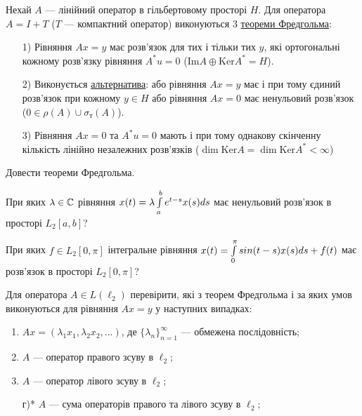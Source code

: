 
\begin{theory}
    Нехай $A$ --- лінійний оператор в гільбертовому просторі $H$. 
    Для оператора $A = I + T$ ($T$ --- компактний оператор) виконуються 
    3 \ul{теореми Фредгольма}:
    \begin{enumerate}
        \item[1)] Рівняння $Ax = y$ має розв'язок для тих і 
        тільки тих $y$, які ортогональні кожному розв'язку рівняння 
        $A^*u = 0$ ($\mathrm{Im} A \oplus \mathrm{Ker} A^* = H$).
        \item[2)] Виконується \ul{альтернатива}: або рівняння $Ax = y$ 
        має і при тому єдиний розв'язок при кожному $y \in H$ або рівняння 
        $Ax = 0$ має ненульовий розв'язок ($0 \in \rho(A) \cup \sigma_\text{т}(A)$).
        \item[3)] Рівняння $Ax = 0$ та $A^* u = 0$ мають і при тому 
        однакову скінченну кількість лінійно незалежних розв'язків 
        ($\dim \mathrm{Ker} A = \dim \mathrm{Ker} A^* < \infty$)
    \end{enumerate}
\end{theory}

\begin{exercise}
    Довести теореми Фредгольма.
\end{exercise}

\begin{exercise}
    При яких $\lambda \in \mathbb{C}$ рівняння $x(t) = \lambda 
    \int\limits_{a}^{b}e^{t-s}x(s)ds$ має ненульовий розв'язок в просторі 
    $L_2[a, b]$?
\end{exercise}

\begin{exercise}\label{N:1_8_12}
    При яких $f \in L_2 [0, \pi]$ інтегральне рівняння $x(t) = 
    \int\limits_{0}^{\pi} sin(t-s)x(s)ds + f(t)$ має розв'язок в просторі 
    $L_2[0, \pi]$?
\end{exercise}

\begin{exercise}
    Для оператора $A \in L(\ell_2)$ перевірити, які з теорем 
    Фредгольма і за яких умов виконуються для рівняння $Ax = y$ у 
    наступних випадках:
    \begin{enumerate}
        \item $Ax = (\lambda_1 x_1, \lambda_2 x_2, ...)$, де 
        $\{\lambda_n\}_{n=1}^\infty$ --- обмежена послідовність;
        \item $A$ --- оператор правого зсуву в $\ell_2$;
        \item $A$ --- оператор лівого зсуву в $\ell_2$;
        \item[г)*] $A$ --- сума операторів правого та лівого 
        зсуву в $\ell_2$;
    \end{enumerate}
\end{exercise}

